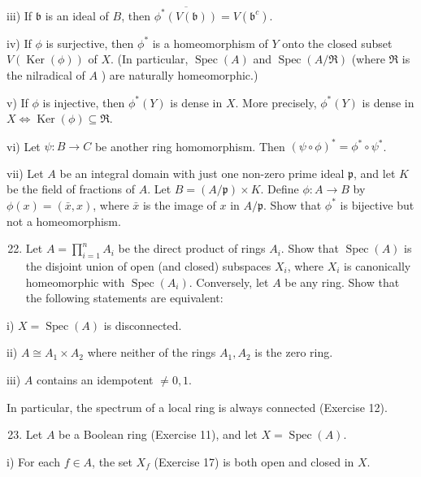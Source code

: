 \documentclass{standalone}
\theoremstyle{definition}
\theoremstyle{remark}
\begin{document}
iii) If $\mathfrak{b}$ is an ideal of $B$, then $\overline{\phi^{*}(V(\mathfrak{b}))}=V\left(\mathfrak{b}^{c}\right)$.

iv) If $\phi$ is surjective, then $\phi^{*}$ is a homeomorphism of $Y$ onto the closed subset $V(\operatorname{Ker}(\phi))$ of $X$. (In particular, $\operatorname{Spec}(A)$ and $\operatorname{Spec}(A / \mathfrak{R})$ (where $\mathfrak{R}$ is the nilradical of $A$ ) are naturally homeomorphic.)

v) If $\phi$ is injective, then $\phi^{*}(Y)$ is dense in $X$. More precisely, $\phi^{*}(Y)$ is dense in $X \Leftrightarrow \operatorname{Ker}(\phi) \subseteq \Re$.

vi) Let $\psi: B \rightarrow C$ be another ring homomorphism. Then $(\psi \circ \phi)^{*}=\phi^{*} \circ \psi^{*}$.

vii) Let $A$ be an integral domain with just one non-zero prime ideal $\mathfrak{p}$, and let $K$ be the field of fractions of $A$. Let $B=(A / \mathfrak{p}) \times K$. Define $\phi: A \rightarrow B$ by $\phi(x)=(\bar{x}, x)$, where $\bar{x}$ is the image of $x$ in $A / \mathfrak{p}$. Show that $\phi^{*}$ is bijective but not a homeomorphism.

\begin{enumerate}
  \setcounter{enumi}{21}
  \item Let $A=\prod_{i=1}^{n} A_{i}$ be the direct product of rings $A_{i}$. Show that $\operatorname{Spec}(A)$ is the disjoint union of open (and closed) subspaces $X_{i}$, where $X_{i}$ is canonically homeomorphic with $\operatorname{Spec}\left(A_{i}\right)$. Conversely, let $A$ be any ring. Show that the following statements are equivalent:
\end{enumerate}

i) $X=\operatorname{Spec}(A)$ is disconnected.

ii) $A \cong A_{1} \times A_{2}$ where neither of the rings $A_{1}, A_{2}$ is the zero ring.

iii) $A$ contains an idempotent $\neq 0,1$.

In particular, the spectrum of a local ring is always connected (Exercise 12).

\begin{enumerate}
  \setcounter{enumi}{22}
  \item Let $A$ be a Boolean ring (Exercise 11), and let $X=\operatorname{Spec}(A)$.
\end{enumerate}

i) For each $f \in A$, the set $X_{f}$ (Exercise 17) is both open and closed in $X$.
\end{document}
